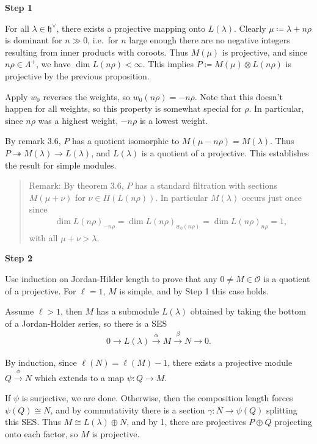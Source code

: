 \documentclass[11pt]{scrartcl}
\theoremstyle{definition}
\theoremstyle{theorem}
\theoremstyle{proof}
\newenvironment{proof}
{\pushQED{$\qed$}\pf}
{\par\popQED\endpf}
\theoremstyle{definition}
\theoremstyle{break}
\theoremstyle{problem}
\newcommand{\definedas}[0]{\coloneqq}
\newcommand{\dual}[0]{^\vee}
\newcommand{\lieh}[0]{{\mathfrak{h}}}
\newcommand{\mapsvia}[1]{\xrightarrow{#1}}
\newcommand{\OO}[0]{{\mathcal{O}}}
\newcommand{\surjects}[0]{\twoheadrightarrow}
\newcommand{\tensor}[0]{\otimes}
\renewcommand{\qed}[0]{\hfill\blacksquare}
\renewcommand{\to}[0]{\longrightarrow}
\begin{document}
\begin{proof}

\textbf{Step 1}

For all \(\lambda \in \lieh\dual\), there exists a projective mapping
onto \(L(\lambda)\). Clearly \(\mu \definedas \lambda + n\rho\) is
dominant for \(n\gg 0\), i.e.~for \(n\) large enough there are no
negative integers resulting from inner products with coroots. Thus
\(M(\mu)\) is projective, and since \(n\rho \in \Lambda^+\), we have
\(\dim L(n\rho) < \infty\). This implies
\(P \definedas M(\mu) \tensor L(n\rho)\) is projective by the previous
proposition.

Apply \(w_0\) reverses the weights, so \(w_0(n\rho) = -n\rho\). Note
that this doesn't happen for all weights, so this property is somewhat
special for \(\rho\). In particular, since \(n\rho\) was a highest
weight, \(-n\rho\) is a lowest weight.

By remark 3.6, \(P\) has a quotient isomorphic to
\(M(\mu - n\rho) = M(\lambda)\). Thus
\(P \surjects M(\lambda) \to L(\lambda)\), and \(L(\lambda)\) is a
quotient of a projective. This establishes the result for simple
modules.

\begin{quote}
Remark: By theorem 3.6, \(P\) has a standard filtration with sections
\(M(\mu + \nu)\) for \(\nu \in \Pi(L(n\rho))\). In particular
\(M(\lambda)\) occurs just once since
\begin{align*}\dim L(n\rho)_{-n\rho} = \dim L(n\rho)_{w_0(n\rho)} = \dim L(n\rho)_{n\rho} = 1,\end{align*}
with all \(\mu + \nu > \lambda\).
\end{quote}

\textbf{Step 2}

Use induction on Jordan-Hilder length to prove that any
\(0\neq M\in \OO\) is a quotient of a projective. For \(\ell = 1\),
\(M\) is simple, and by Step 1 this case holds.

Assume \(\ell > 1\), then \(M\) has a submodule \(L(\lambda)\) obtained
by taking the bottom of a Jordan-Holder series, so there is a SES
\begin{align*}0 \to L(\lambda) \mapsvia{\alpha} M \mapsvia{\beta} N \to 0.\end{align*}

By induction, since \(\ell(N) = \ell(M) - 1\), there exists a projective
module \(Q \mapsvia{\phi} N\) which extends to a map \(\psi: Q \to M\).

If \(\psi\) is surjective, we are done. Otherwise, then the composition
length forces \(\psi(Q) \cong N\), and by commutativity there is a
section \(\gamma: N \to \psi(Q)\) splitting this SES. Thus
\(M \cong L(\lambda) \oplus N\), and by 1, there are projectives
\(P \oplus Q\) projecting onto each factor, so \(M\) is projective.


\end{proof}
\end{document}
